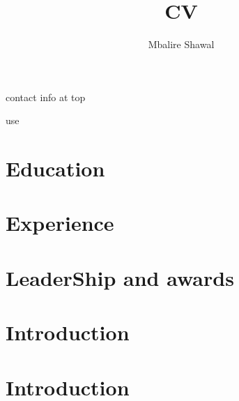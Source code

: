 \documentclass{article}
\begin{document}
\title{CV}
\author{ Mbalire Shawal }
contact info at top



use
\maketitle
\section{Education}

\section{Experience}

\section{LeaderShip and awards}

\section{Introduction}

\section{Introduction}
\end{document}
